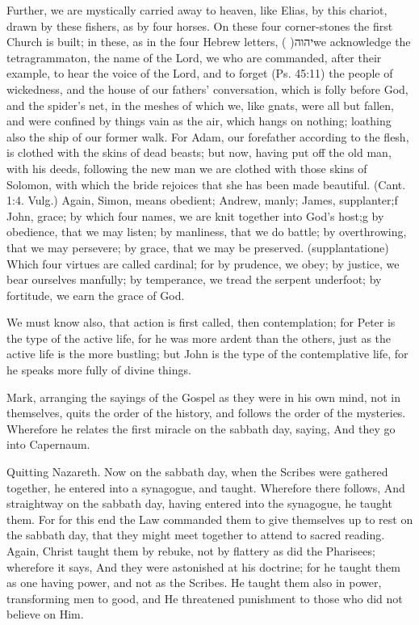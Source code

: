  Further, we are mystically carried away to heaven, like Elias, by this chariot, drawn by these fishers, as by four horses. On these four corner-stones the first Church is built; in these, as in the four Hebrew letters, ( )\texthebrew{יהוה}we acknowledge the tetragrammaton, the name of the Lord, we who are commanded, after their example, to hear the voice of the Lord, and to forget (Ps. 45:11) the people of wickedness, and the house of our fathers’ conversation, which is folly before God, and the spider’s net, in the meshes of which we, like gnats, were all but fallen, and were confined by things vain as the air, which hangs on nothing; loathing also the ship of our former walk. For Adam, our forefather according to the flesh, is clothed with the skins of dead beasts; but now, having put off the old man, with his deeds, following the new man we are clothed with those skins of Solomon, with which the bride rejoices that she has been made beautiful. (Cant. 1:4. Vulg.) Again, Simon, means obedient; Andrew, manly; James, supplanter;f John, grace; by which four names, we are knit together into God’s host;g by obedience, that we may listen; by manliness, that we do battle; by overthrowing, that we may persevere; by grace, that we may be preserved. (supplantatione) Which four virtues are called cardinal; for by prudence, we obey; by justice, we bear ourselves manfully; by temperance, we tread the serpent underfoot; by fortitude, we earn the grace of God.

 We must know also, that action is first called, then contemplation; for Peter is the type of the active life, for he was more ardent than the others, just as the active life is the more bustling; but John is the type of the contemplative life, for he speaks more fully of divine things.

 

 Mark, arranging the sayings of the Gospel as they were in his own mind, not in themselves, quits the order of the history, and follows the order of the mysteries. Wherefore he relates the first miracle on the sabbath day, saying, And they go into Capernaum.

 Quitting Nazareth. Now on the sabbath day, when the Scribes were gathered together, he entered into a synagogue, and taught. Wherefore there follows, And straightway on the sabbath day, having entered into the synagogue, he taught them. For for this end the Law commanded them to give themselves up to rest on the sabbath day, that they might meet together to attend to sacred reading. Again, Christ taught them by rebuke, not by flattery as did the Pharisees; wherefore it says, And they were astonished at his doctrine; for he taught them as one having power, and not as the Scribes. He taught them also in power, transforming men to good, and He threatened punishment to those who did not believe on Him.

